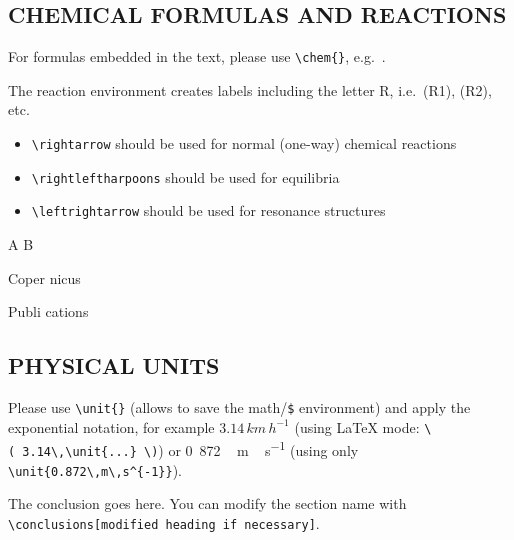 \documentclass[gmd, manuscript]{copernicus}
\begin{document}
\subsection{CHEMICAL FORMULAS AND REACTIONS}

For formulas embedded in the text, please use
\texttt{\textbackslash{}chem\{\}}, e.g.~.

The reaction environment creates labels including the letter R,
i.e.~(R1), (R2), etc.

\begin{itemize}
\item
  \texttt{\textbackslash{}rightarrow} should be used for normal
  (one-way) chemical reactions
\item
  \texttt{\textbackslash{}rightleftharpoons} should be used for
  equilibria
\item
  \texttt{\textbackslash{}leftrightarrow} should be used for resonance
  structures
\end{itemize}

\begin{reaction}
A \rightarrow B \\
\end{reaction}
\begin{reaction}
Coper \rightleftharpoons nicus \\
\end{reaction}
\begin{reaction}
Publi \leftrightarrow cations
\end{reaction}

\subsection{PHYSICAL UNITS}

Please use \texttt{\textbackslash{}unit\{\}} (allows to save the
math/\texttt{\$} environment) and apply the exponential notation, for
example \(3.14\,\unit{km\,h^{-1}}\) (using LaTeX mode:
\texttt{\textbackslash{}(\ 3.14\textbackslash{},\textbackslash{}unit\{...\}\ \textbackslash{})})
or \unit{0.872\,m\,s^{-1}} (using only
\texttt{\textbackslash{}unit\{0.872\textbackslash{},m\textbackslash{},s\^{}\{-1\}\}}).

\conclusions[Conclusions]

The conclusion goes here. You can modify the section name with
\texttt{\textbackslash{}conclusions{[}modified\ heading\ if\ necessary{]}}.



\end{document}
